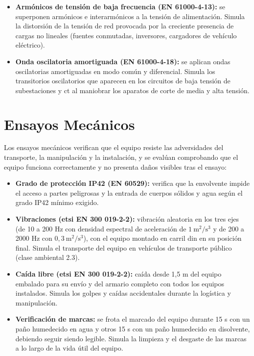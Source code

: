 \begin{itemize}
    \item \textbf{Armónicos de tensión de baja frecuencia (EN 61000-4-13):} se superponen armónicos e interarmónicos a la tensión de alimentación. Simula la distorsión de la tensión de red provocada por la creciente presencia de cargas no lineales (fuentes conmutadas, inversores, cargadores de vehículo eléctrico).
    \item \textbf{Onda oscilatoria amortiguada (EN 61000-4-18):} se aplican ondas oscilatorias amortiguadas en modo común y diferencial. Simula los transitorios oscilatorios que aparecen en los circuitos de baja tensión de subestaciones y \gls{ct} al maniobrar los aparatos de corte de media y alta tensión.
\end{itemize}

\section{Ensayos Mecánicos}
\label{sec:ensayos_mecanicos}

Los ensayos mecánicos verifican que el equipo resiste las adversidades del transporte, la manipulación y la instalación, y se evalúan comprobando que el equipo funciona correctamente y no presenta daños visibles tras el ensayo:

\begin{itemize}
    \item \textbf{Grado de protección IP42 (EN 60529):} verifica que la envolvente impide el acceso a partes peligrosas y la entrada de cuerpos sólidos y agua según el grado IP42 mínimo exigido.
    \item \textbf{Vibraciones (\gls{etsi} EN 300 019-2-2):} vibración aleatoria en los tres ejes (de 10 a 200 Hz con densidad espectral de aceleración de $1\ \text{m}^2/\text{s}^3$ y de 200 a 2000 Hz con $0,3\ \text{m}^2/\text{s}^3$), con el equipo montado en carril \gls{din} en su posición final. Simula el transporte del equipo en vehículos de transporte público (clase ambiental 2.3).
    \item \textbf{Caída libre (\gls{etsi} EN 300 019-2-2):} caída desde 1,5 m del equipo embalado para su envío y del armario completo con todos los equipos instalados. Simula los golpes y caídas accidentales durante la logística y manipulación.
    \item \textbf{Verificación de marcas:} se frota el marcado del equipo durante 15 s con un paño humedecido en agua y otros 15 s con un paño humedecido en disolvente, debiendo seguir siendo legible. Simula la limpieza y el desgaste de las marcas a lo largo de la vida útil del equipo.
\end{itemize}

